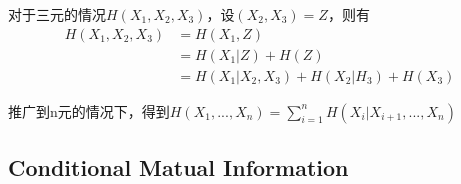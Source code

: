 \documentclass[a4paper, 12pt]{article}
\begin{document}
    对于三元的情况$H(X_1,X_2,X_3)$，设$(X_2,X_3)=Z$，则有
    \begin{align}
        H(X_1,X_2,X_3)&=H(X_1,Z)\\
        &=H(X_1|Z)+H(Z)\\
        &=H(X_1|X_2,X_3)+H(X_2|H_3)+H(X_3)
    \end{align}

    推广到n元的情况下，得到$H(X_1,...,X_n)=\sum_{i=1}^nH(X_i|X_{i+1},...,X_n)$
    \subsection{Conditional Matual Information}
\end{document}
